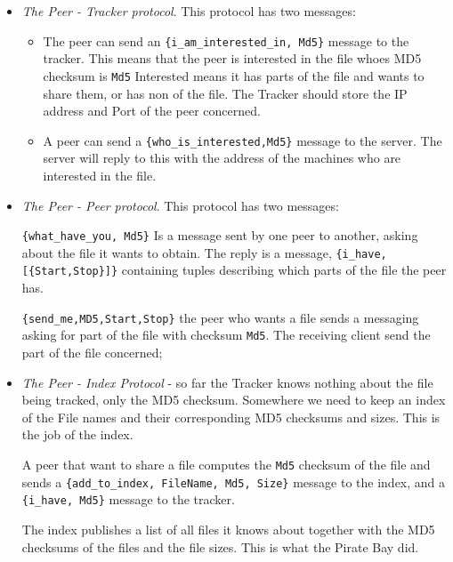 \documentclass[12pt]{hitec}
\begin{document}
\begin{itemize}
  
\item {\sl The Peer - Tracker protocol}. This protocol has two messages:
  \begin{itemize}

  \item
    The peer can send an \verb+{i_am_interested_in, Md5}+ message to
    the tracker.  This means that the peer is interested in the file
    whoes MD5 checksum is \verb+Md5+ Interested means it has parts of
    the file and wants to share them, or has non of the file.  The
    Tracker should store the IP address and Port of the peer
    concerned.

  \item A peer can send a \verb+{who_is_interested,Md5}+ message to the
    server. The server will reply to this with the address of the
    machines who are interested in the file.

  \end{itemize}

\item {\sl The Peer - Peer protocol}. This protocol has two messages:

  \verb+{what_have_you, Md5}+ Is a message sent by one peer to another, asking
  about the file it wants to obtain. The reply is a message,
  \verb+{i_have,[{Start,Stop}]}+ containing tuples
  describing which parts of the file the peer has.
  
  \verb+{send_me,MD5,Start,Stop}+ the peer who wants a file sends a
  messaging asking for part of the file with checksum \verb+Md5+.
  The receiving client send the part of the file concerned;

\item {\sl The Peer - Index Protocol} - so far the Tracker knows
  nothing about the file being tracked, only the MD5
  checksum. Somewhere we need to keep an index of the File names and
  their corresponding MD5 checksums and sizes. This is the job of the
  index.

  A peer that want to share a file computes the \verb+Md5+ checksum of the file
  and sends a \verb+{add_to_index, FileName, Md5, Size}+ message to the index,
  and a \verb+{i_have, Md5}+ message to the tracker.

  The index publishes a list of all files it knows about together with the
  MD5 checksums of the files and the file sizes. This is what the Pirate Bay did.
  
\end{itemize}
\end{document}
